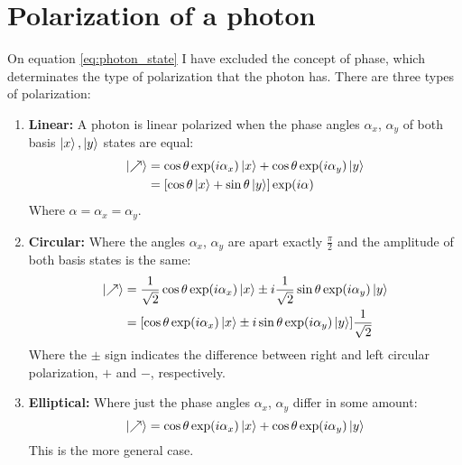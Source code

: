 \chapter{Polarization of a photon}
\label{appendix:optics}
On equation \ref{eq:photon_state} I have excluded the concept of phase, which determinates the type of polarization that the photon has. There are three types of polarization:
\begin{enumerate}
	\item \textbf{Linear:}
	A photon is linear polarized when the phase angles $\alpha_x$, $\alpha_y$ of both basis $\ket{x},\ket{y}$ states are equal:
	\begin{align*}
		\ket{\nearrow} &= \cos\theta\exp(i\alpha_x)\ket{x} + \cos\theta\exp(i\alpha_y)\ket{y} \\
		&= [\cos\theta\ket{x} + \sin\theta\ket{y}]\exp(i\alpha)
	\end{align*}
	Where $\alpha=\alpha_x=\alpha_y$.
	
	\item \textbf{Circular:}
	Where the angles $\alpha_x$, $\alpha_y$ are apart exactly $\frac{\pi}{2}$ and the amplitude of both basis states is the same:
	\begin{align*}
		\ket{\nearrow} &= \frac{1}{\sqrt{2}}\cos\theta\exp(i\alpha_x)\ket{x} \pm i\frac{1}{\sqrt{2}}\sin\theta\exp(i\alpha_y)\ket{y} \\
					   &= [\cos\theta\exp(i\alpha_x)\ket{x} \pm i\sin\theta\exp(i\alpha_y)\ket{y}]\frac{1}{\sqrt{2}}
	\end{align*}
Where the $\pm$ sign indicates the difference between right and left circular polarization, $+$ and $-$, respectively. 

	\item \textbf{Elliptical:}
	Where just the phase angles $\alpha_x$, $\alpha_y$ differ in some amount:
	$$
	\ket{\nearrow} = \cos\theta\exp(i\alpha_x)\ket{x} + \cos\theta\exp(i\alpha_y)\ket{y}
	$$
	This is the more general case.
	
\end{enumerate}